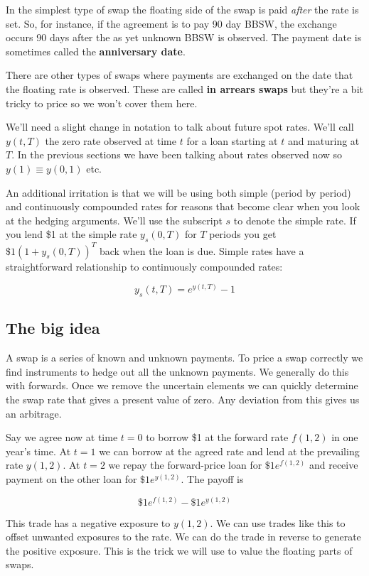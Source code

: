 In the simplest type of swap the floating side of the swap is paid \textit{after} the rate is set. So, for instance, if the agreement is to pay 90 day BBSW, the exchange occurs 90 days after the as yet unknown BBSW is observed. The payment date is sometimes called the \textbf{anniversary date}. 

There are other types of swaps where payments are exchanged on the date that the floating rate is observed. These are called \textbf{in arrears swaps} but they're a bit tricky to price so we won't cover them here.

We'll need a slight change in notation to talk about future spot rates. We'll call $y(t,T)$ the zero rate observed at time $t$ for a loan starting at $t$ and maturing at $T$. In the previous sections we have been talking about rates observed now so $y(1) \equiv y(0,1)$ etc.

An additional irritation is that we will be using both simple (period by period) and continuously compounded rates for reasons that become clear when you look at the hedging arguments. We'll use the subscript $s$ to denote the simple rate. If you lend \$1 at the simple rate $y_s(0,T)$ for $T$ periods you get $\$1(1+y_s(0,T))^T$ back when the loan is due. Simple rates have a straightforward relationship to continuously compounded rates:

\[ y_s(t,T) = e^{y(t,T)}-1\]

\subsection{The big idea}

A swap is a series of known and unknown payments. To price a swap correctly we find instruments to hedge out all the unknown payments. We generally do this with forwards. Once we remove the uncertain elements we can quickly determine the swap rate that gives a present value of zero. Any deviation from this gives us an arbitrage.

Say we agree now at time $t=0$ to borrow \$1 at the forward rate $f(1,2)$ in one year's time. At $t=1$ we can borrow at the agreed rate and lend at the prevailing rate $y(1,2)$. At $t=2$ we repay the forward-price loan for $\$1e^{f(1,2)}$ and receive payment on the other loan for $\$1e^{y(1,2)}$. The payoff is

\[ \$1e^{f(1,2)} -\$1e^{y(1,2)} \]

This trade has a negative exposure to $y(1,2)$. We can use trades like this to offset unwanted exposures to the rate. We can do the trade in reverse to generate the positive exposure. This is the trick we will use to value the floating parts of swaps. 

